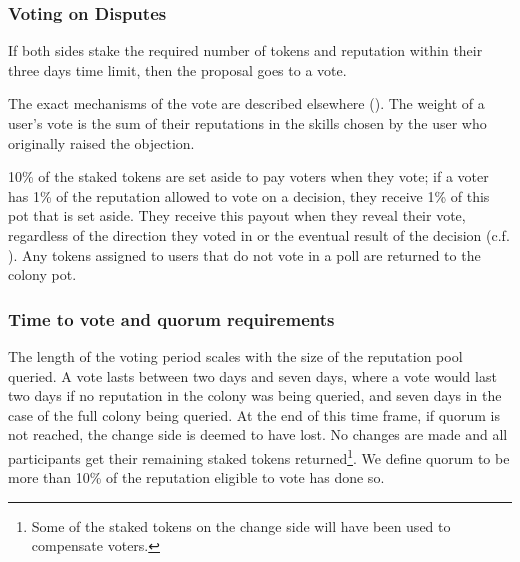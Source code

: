 
\subsubsection{Voting on Disputes}
If both sides stake the required number of tokens and reputation within their three days time limit, then the proposal goes to a vote.

The exact mechanisms of the vote are described elsewhere (\cite{ColonyVoting}). The weight of a user's vote is the sum of their reputations in the skills chosen by the user who originally raised the objection.


10\% of the staked tokens are set aside to pay voters when they vote; if a voter has 1\% of the reputation allowed to vote on a decision, they receive 1\% of this pot that is set aside. They receive this payout when they reveal their vote, regardless of the direction they voted in or the eventual result of the decision (c.f. \cite{KeynesianBeauty}). Any tokens assigned to users that do not vote in a poll are returned to the colony pot.


\subsubsection{Time to vote and quorum requirements}
The length of the voting period scales with the size of the reputation pool queried. A vote lasts between two days and seven days, where a vote would last two days if no reputation in the colony was being queried, and seven days in the case of the full colony being queried. At the end of this time frame, if quorum is not reached, the change side is deemed to have lost. No changes are made and all participants get their remaining staked tokens returned\footnote{Some of the staked tokens on the change side will have been used to compensate voters.}. We define quorum to be more than 10\% of the reputation eligible to vote has done so.


